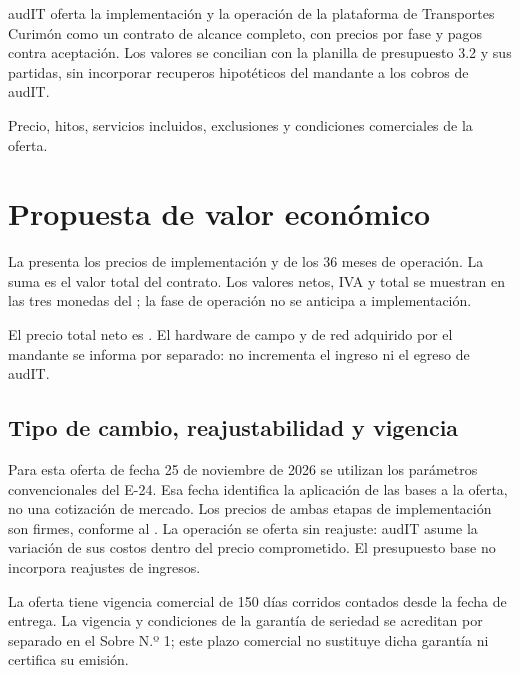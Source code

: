 \begin{resumenApertura}
audIT oferta la implementación y la operación de la plataforma de Transportes Curimón como un
contrato de alcance completo, con precios por fase y pagos contra aceptación. Los valores se
concilian con la planilla de presupuesto 3.2 y sus partidas, sin incorporar recuperos hipotéticos
del mandante a los cobros de audIT.
\begin{recibe}
\item Precio, hitos, servicios incluidos, exclusiones y condiciones comerciales de la oferta.
\end{recibe}
\end{resumenApertura}

\section{Propuesta de valor económico}\label{sec:eco-valor}

La  presenta los precios de implementación y de los 36 meses de operación.
La suma es el valor total del contrato. Los valores netos, IVA y total se muestran en las tres
monedas del ; la fase de operación no se anticipa a implementación.


El precio total neto es . El hardware de campo y de red adquirido por el
mandante se informa por separado: no incrementa el ingreso ni el egreso de audIT.

\subsection{Tipo de cambio, reajustabilidad y vigencia}\label{sec:eco-condiciones}

Para esta oferta de fecha 25 de noviembre de 2026 se utilizan los parámetros convencionales
del E-24. Esa fecha identifica la aplicación de las bases a la oferta, no una cotización de
mercado. Los precios de ambas etapas de implementación son firmes, conforme al
. La operación se oferta sin reajuste: audIT asume la variación de sus costos
dentro del precio comprometido. El presupuesto base no incorpora reajustes de ingresos.

La oferta tiene vigencia comercial de 150 días corridos contados desde la fecha de entrega.
La vigencia y condiciones de la garantía de seriedad se acreditan por separado en el Sobre
N.º 1; este plazo comercial no sustituye dicha garantía ni certifica su emisión.

